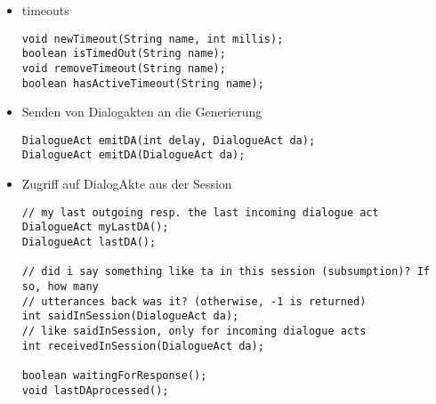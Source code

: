 \begin{itemize}
\item timeouts
\begin{verbatim}
void newTimeout(String name, int millis);
boolean isTimedOut(String name);
void removeTimeout(String name);
boolean hasActiveTimeout(String name);
\end{verbatim}
\item Senden von Dialogakten an die Generierung
\begin{verbatim}
DialogueAct emitDA(int delay, DialogueAct da);
DialogueAct emitDA(DialogueAct da);
\end{verbatim}
\item Zugriff auf DialogAkte aus der Session
\begin{verbatim}
// my last outgoing resp. the last incoming dialogue act
DialogueAct myLastDA();
DialogueAct lastDA();

// did i say something like ta in this session (subsumption)? If so, how many
// utterances back was it? (otherwise, -1 is returned)
int saidInSession(DialogueAct da);
// like saidInSession, only for incoming dialogue acts
int receivedInSession(DialogueAct da);

boolean waitingForResponse();
void lastDAprocessed();
\end{verbatim}
\end{itemize}

